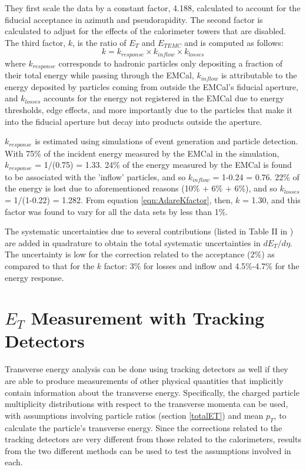They first scale the data by a constant factor, 4.188, calculated to account for the fiducial acceptance in azimuth and pseudorapidity. The second factor is calculated to adjust for the effects of the calorimeter towers that are disabled. The third factor, $k$, is the ratio of $E_{T}$ and $E_{{T}EMC}$ and is computed as follows:
\begin{equation}\label{eqn:AdareKfactor}
k = k_{response} \times k_{inflow} \times k_{losses}
\end{equation}
where $k_{response}$ corresponds to hadronic particles only depositing a fraction of their total energy while passing through the EMCal, $k_{inflow}$ is attributable to the energy deposited by particles coming from outside the EMCal's fiducial aperture, and $k_{losses}$ accounts for the energy not registered in the EMCal due to energy thresholds, edge effects, and more importantly due to the particles that make it into the fiducial aperture but decay into products outside the aperture.

$k_{response}$ is estimated using simulations of event generation and particle detection. With 75\% of the incident energy measured by the EMCal in the simulation, $k_{response}$ = 1/(0.75) = 1.33. 24\% of the energy measured by the EMCal is found to be associated with the 'inflow' particles, and so $k_{inflow}$ = 1-0.24 = 0.76. 22\% of the energy is lost due to aforementioned reasons (10\% + 6\% + 6\%), and so $k_{losses}$ = 1/(1-0.22) = 1.282. From equation \ref{eqn:AdareKfactor}, then, $k$ = 1.30, and this factor was found to vary for all the data sets by less than 1\%. 

The systematic uncertainties due to several contributions (listed in Table II in \cite{PhysRevC.93.024901}) are added in quadrature to obtain the total systematic uncertainties in $dE_{T}/d\eta$. The uncertainty is low for the correction related to the acceptance (2\%)
as compared to that for the $k$ factor: 3\% for losses and inflow and 4.5\%-4.7\% for the energy response.

\section{$E_{T}$ Measurement with Tracking Detectors}
Transverse energy analysis can be done using tracking detectors as well if they are able to produce measurements of other physical quantities that implicitly contain information about the transverse energy. Specifically, the charged particle multiplicity distributions with respect to the transverse momenta can be used, with assumptions involving particle ratios (section \ref{totalET}) and mean $p_{T}$, to calculate the particle's transverse energy. Since the corrections related to the tracking detectors are very different from those related to the calorimeters, results from the two different methods can be used to test the assumptions involved in each.

